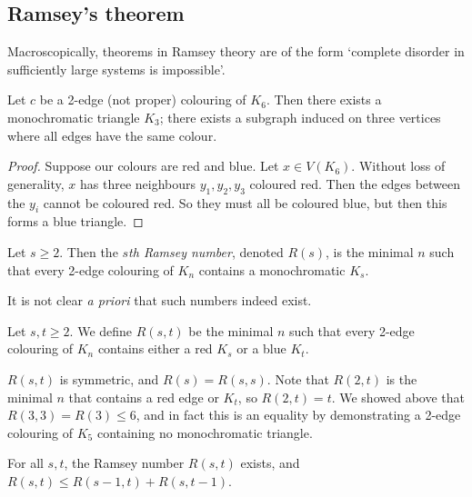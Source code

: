\subsection{Ramsey's theorem}
Macroscopically, theorems in Ramsey theory are of the form `complete disorder in sufficiently large systems is impossible'.
\begin{proposition}
	Let \( c \) be a 2-edge (not proper) colouring of \( K_6 \).
	Then there exists a monochromatic triangle \( K_3 \); there exists a subgraph induced on three vertices where all edges have the same colour.
\end{proposition}
\begin{proof}
	Suppose our colours are red and blue.
	Let \( x \in V(K_6) \).
	Without loss of generality, \( x \) has three neighbours \( y_1, y_2, y_3 \) coloured red.
	Then the edges between the \( y_i \) cannot be coloured red.
	So they must all be coloured blue, but then this forms a blue triangle.
\end{proof}
\begin{definition}
	Let \( s \geq 2 \).
	Then the \emph{\( s \)th Ramsey number}, denoted \( R(s) \), is the minimal \( n \) such that every 2-edge colouring of \( K_n \) contains a monochromatic \( K_s \).
\end{definition}
It is not clear \emph{a priori} that such numbers indeed exist.
\begin{definition}
	Let \( s, t \geq 2 \).
	We define \( R(s,t) \) be the minimal \( n \) such that every 2-edge colouring of \( K_n \) contains either a red \( K_s \) or a blue \( K_t \).
\end{definition}
\begin{remark}
	\( R(s, t) \) is symmetric, and \( R(s) = R(s,s) \).
	Note that \( R(2,t) \) is the minimal \( n \) that contains a red edge or \( K_t \), so \( R(2,t) = t \).
	We showed above that \( R(3,3) = R(3) \leq 6 \), and in fact this is an equality by demonstrating a 2-edge colouring of \( K_5 \) containing no monochromatic triangle.
\end{remark}
\begin{theorem}[Ramsey]
	For all \( s, t \), the Ramsey number \( R(s, t) \) exists, and \( R(s,t) \leq R(s-1,t) + R(s,t-1) \).
\end{theorem}
